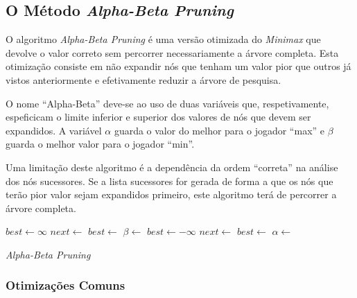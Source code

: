 \documentclass[12pt,a4paper,oneside]{article}
\begin{document}
\subsection{O Método \textit{Alpha-Beta Pruning}}

O algoritmo \emph{Alpha-Beta Pruning} é uma versão otimizada do
\textit{Minimax} que devolve o valor correto sem percorrer
necessariamente a árvore completa. Esta otimização consiste em não
expandir nós que tenham um valor pior que outros já vistos
anteriormente e efetivamente reduzir a árvore de pesquisa.

O nome ``Alpha-Beta'' deve-se ao uso de duas variáveis que,
respetivamente, espeficicam o limite inferior e superior dos valores
de nós que devem ser expandidos\cite{Russell:AI:2003}. A variável
$\alpha$ guarda o valor do melhor para o jogador ``max'' e $\beta$
guarda o melhor valor para o jogador ``min''.

Uma limitação deste algoritmo é a dependência da ordem ``correta'' na
análise dos nós sucessores. Se a lista sucessores for gerada de forma
a que os nós que terão pior valor sejam expandidos primeiro, este
algoritmo terá de percorrer a árvore completa.

\begin{algorithm}
\begin{algorithmic}
   
  \EndIf
      \State $best \gets \infty$
          \State $next \gets$ 
          \State $best \gets$ 
              \State{}
          \EndIf
          \State $\beta \gets$ 
      \EndFor
      \State $best \gets -\infty$
          \State $next \gets$ 
          \State $best \gets$ 
              \State{}
          \EndIf
          \State $\alpha \gets$ 
      \EndFor
  \EndIf
  \State{} 
\EndFunction
\end{algorithmic}
\caption{\emph{Alpha-Beta Pruning}}
\end{algorithm}

\subsubsection{Otimizações Comuns}\label{ab:opt}
\end{document}

